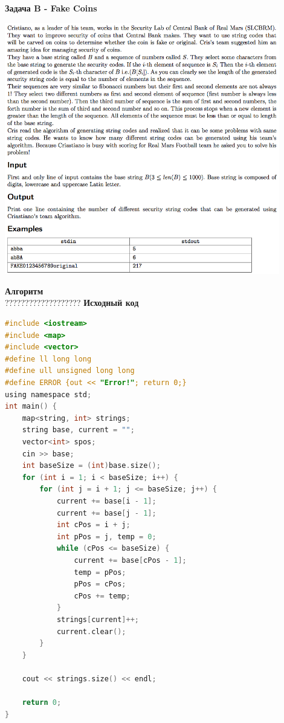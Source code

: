 \documentclass[a4paper,12pt]{article}
\begin{document}
\newpage
\textbf{{\large Задача B - Fake Coins}} \\
\begin{center}
\includegraphics[width=0.9\textwidth]{CT_S02E10/CT_S02E10_B.png}\\ [1cm]
\end{center}
\textbf{{\large Алгоритм}} \\
{\Huge ???????????????????}
\newpage
\textbf{{\large Исходный код}} \\
\begin{lstlisting}[language=C]
#include <iostream>
#include <map>
#include <vector>
#define ll long long
#define ull unsigned long long
#define ERROR {out << "Error!"; return 0;}
using namespace std;
int main() {
    map<string, int> strings;
    string base, current = "";
    vector<int> spos;
    cin >> base;
    int baseSize = (int)base.size();
    for (int i = 1; i < baseSize; i++) {
        for (int j = i + 1; j <= baseSize; j++) {
            current += base[i - 1];
            current += base[j - 1];
            int cPos = i + j;
            int pPos = j, temp = 0;
            while (cPos <= baseSize) {
                current += base[cPos - 1];
                temp = pPos;
                pPos = cPos;
                cPos += temp;
            }
            strings[current]++;
            current.clear();
        }
    }
    
    cout << strings.size() << endl;
    
    return 0;
}
\end{lstlisting}
\end{document}
